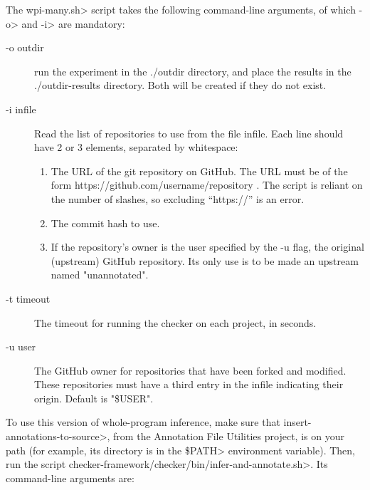 The \<wpi-many.sh> script takes the following command-line arguments, of
which \<-o> and \<-i> are mandatory:

\begin{description}
\item[-o outdir]
  run the experiment in the ./outdir directory, and place the results in
  the ./outdir-results directory. Both will be created if they do not
  exist.

\item[-i infile]
  Read the list of repositories to use from the file infile. Each line
  should have 2 or 3 elements, separated by whitespace:
  \begin{enumerate}
  \item
    The URL of the git repository on GitHub. The URL must be of the form
    https://github.com/username/repository .  The script is reliant on the
    number of slashes, so excluding ``https://'' is an error.
  \item The commit hash to use.
  \item
    If the repository's owner is the user specified by the -u flag, the
    original (upstream) GitHub repository.  Its only use is to be made an
    upstream named "unannotated".
  \end{enumerate}

\item[-t timeout]
  The timeout for running the checker on each project, in seconds.

\item[-u user]
  The GitHub owner for repositories that have been forked and
  modified. These repositories must have a third entry in the infile
  indicating their origin. Default is "\$USER".

\end{description}



\begin{sloppypar}
To use this version of whole-program inference, make sure that
\<insert-annotations-to-source>, from the Annotation File Utilities project,
is on your path (for example, its directory is in the \<\$PATH> environment variable).
Then, run the script \<checker-framework/checker/bin/infer-and-annotate.sh>.
Its command-line arguments are:
\end{sloppypar}

